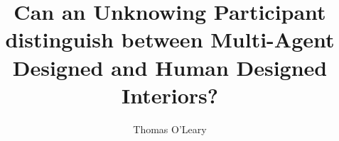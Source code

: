\documentclass[journal]{IEEEtran}
\begin{document}
\title{Can an Unknowing Participant distinguish between Multi-Agent Designed and Human Designed Interiors?}

\author{Thomas O'Leary}

\maketitle

























\end{document}
